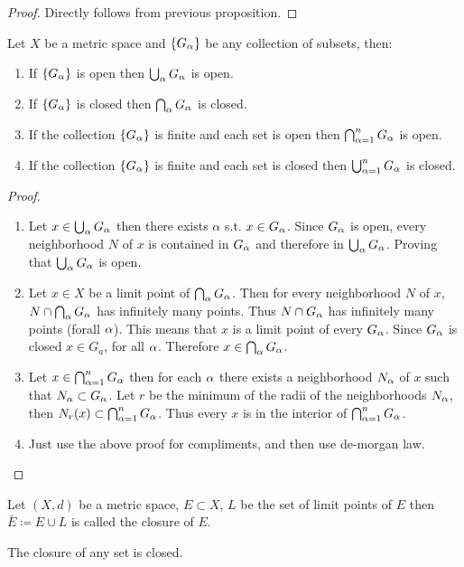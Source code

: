 \begin{proof}
  Directly follows from previous proposition.
\end{proof}
\begin{proposition}
  Let $X$ be a metric space and $\{G_\alpha\}$ be any collection of subsets, then:
  \begin{enumerate}
    \item If $\{G_\alpha\}$ is open then $\bigcup_\alpha G_\alpha$ is open.
    \item If $\{G_\alpha\}$ is closed then $\bigcap_\alpha G_\alpha$ is closed.
    \item If the collection $\{G_\alpha\}$ is finite and each set is open then $\bigcap_{\alpha=1}^n G_\alpha$ is open.
    \item If the collection $\{G_\alpha\}$ is finite and each set is closed then $\bigcup_{\alpha=1}^n G_\alpha$ is closed.
  \end{enumerate}
\end{proposition}
\begin{proof}
  \begin{enumerate}
    \item Let $x\in \bigcup_\alpha G_\alpha$ then there exists $\alpha$ s.t. $x\in G_\alpha$. Since $G_\alpha$ is open, every neighborhood $N$ of $x$ is contained in $G_\alpha$ and therefore in $\bigcup_\alpha G_\alpha$. Proving that $\bigcup_\alpha G_\alpha$ is open.
    \item Let $x\in X$ be a limit point of $\bigcap_\alpha G_\alpha$. Then for every neighborhood $N$ of $x$, $N\cap \bigcap_\alpha G_\alpha$ has infinitely many points. Thus $N\cap G_\alpha$ has infinitely many points (forall $\alpha$). This means that $x$ is a limit point of every $G_\alpha$. Since $G_\alpha$ is closed $x\in G_a$, for all $\alpha$. Therefore $x\in \bigcap_\alpha G_\alpha$.
    \item Let $x\in \bigcap_{\alpha=1}^n G_\alpha$ then for each $\alpha$ there exists a neighborhood $N_\alpha$ of $x$ such that $N_\alpha\subset G_\alpha$. Let $r$ be the minimum of the radii of the neighborhoods $N_\alpha$, then $N_r(x) \subset \bigcap_{\alpha=1}^n G_\alpha$. Thus every $x$ is in the interior of $\bigcap_{\alpha =1}^n G_\alpha$.
    \item Just use the above proof for compliments, and then use de-morgan law.
  \end{enumerate}
\end{proof}
\begin{definition}
  Let $(X,d)$ be a metric space, $E\subset X$, $L$ be the set of limit points of $E$ then $\bar{E} \coloneq E\cup L$ is called the closure of $E$.
\end{definition}
\begin{proposition}
  The closure of any set is closed.
\end{proposition}
